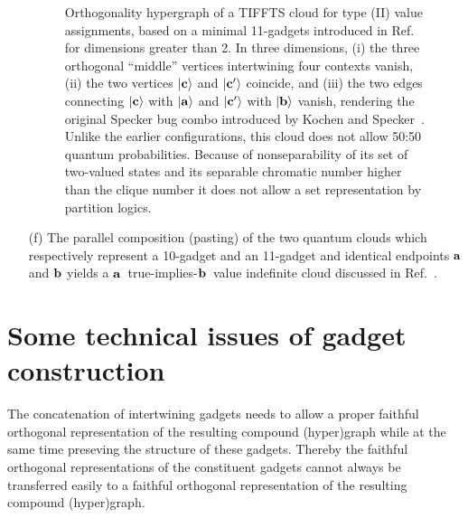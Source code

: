 \documentclass[%
  reprint,
  twocolumn,
 showpacs,
 showkeys,
 preprintnumbers,
 amsmath,amssymb,
 aps,
  prl,
  longbibliography,
 ]{revtex4-1}
\begin{document}
\begin{enumerate}
\begin{figure}
\begin{center}
\begin{tikzpicture}  [scale=0.8, rotate= 0]
\end{tikzpicture}
\end{center}
\caption{
\label{2018-c-f-TIFFTS}
Orthogonality hypergraph of a TIFFTS cloud for type (II) value assignments,
based on a minimal 11-gadgets introduced in Ref.~\cite[Fig.~6]{2018-minimalYIYS} for dimensions greater than 2.
In three dimensions,
(i) the three orthogonal ``middle'' vertices intertwining four contexts vanish,
(ii) the two vertices $\vert {\bf c}\rangle$ and $\vert {\bf c}'\rangle$  coincide, and
(iii) the two edges connecting $\vert {\bf c}\rangle$ with $\vert {\bf a}\rangle$  and $\vert {\bf c}'\rangle$
with $\vert {\bf b}\rangle$ vanish,
rendering the original Specker bug combo introduced by Kochen and Specker~\cite[$\Gamma_3$, p.~70]{kochen1}.
Unlike the earlier configurations, this cloud does not allow 50:50 quantum probabilities.
Because of nonseparability of its set of two-valued states
and its separable chromatic number higher than the clique number
it does not allow a set representation by partition logics.
}
\end{figure}

\item[(f)]
The parallel composition (pasting) of the two quantum clouds which respectively represent a 10-gadget and an 11-gadget
and identical endpoints   ${\bf a}$ and ${\bf b}$ yields a ${\bf a}$~true-implies-${\bf b}$~value indefinite cloud discussed in Ref.~\cite{2015-AnalyticKS}.

\end{enumerate}


\section{Some technical issues of gadget construction}

The concatenation of intertwining gadgets needs to allow a proper faithful orthogonal representation
of the resulting compound (hyper)graph while at the same time preseving the structure of these gadgets.
Thereby the faithful orthogonal representations of the constituent gadgets cannot always be transferred
easily to a faithful orthogonal representation of the resulting compound (hyper)graph.
\end{document}
